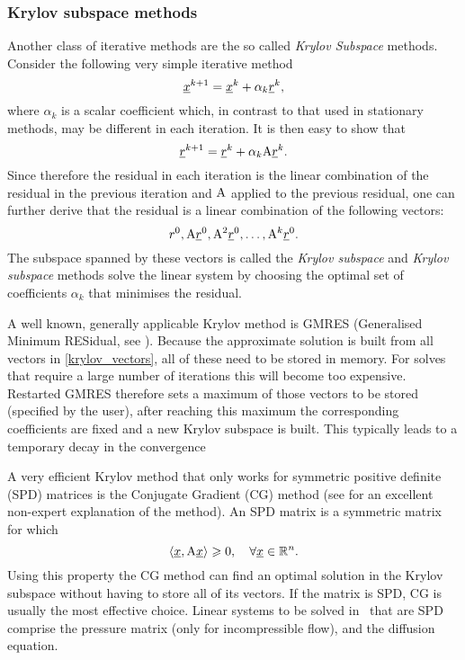 \subsubsection{Krylov subspace methods} \label{sec:krylov_subspace_methods}
Another class of iterative methods are the so called
\emph{Krylov Subspace} methods. Consider the following very
simple iterative method
\begin{equation*}
  \underline{x}^{k+1}=\underline{x}^k + \alpha_k \underline{r}^k,
\end{equation*}
where $\alpha_k$ is a scalar coefficient which,
in contrast to that used in stationary methods, may be different in each
iteration. It is then easy to show that
\begin{equation*}
  \underline{r}^{k+1}=\underline{r}^k+\alpha_k \mathrm{A}\underline{r}^k.
\end{equation*}
Since therefore the residual in each iteration is the linear
combination of the residual in the previous iteration and $\mathrm{A}$
applied to the previous residual, one can further derive that the
residual is a linear combination of the following vectors:
\begin{equation}\label{krylov_vectors}
  r^0, \mathrm{A}\underline{r}^{0}, \mathrm{A}^2\underline{r}^0, \ldots, \mathrm{A}^k\underline{r}^0.
\end{equation}
The subspace spanned by these vectors is called the \emph{Krylov subspace}
and \emph{Krylov subspace} methods solve the linear system by choosing
the optimal set of coefficients $\alpha_k$ that minimises the residual.

A well known, generally applicable Krylov method is GMRES
(Generalised Minimum RESidual, see \citet{saad1993}). Because the approximate solution
is built from all vectors in \eqref{krylov_vectors}, all of these need
to be stored in memory. For solves that require a large number of
iterations this will become too expensive. Restarted GMRES therefore sets
a maximum of those vectors to be stored (specified by the user),
after reaching this maximum the corresponding coefficients are fixed
and a new Krylov subspace is built. This typically leads to a
temporary decay in the convergence

A very efficient Krylov method that only works for symmetric
positive definite (SPD) matrices is the Conjugate
Gradient (CG) method (see \citet{shewchuk1994} for
an excellent non-expert explanation of the
method). An SPD matrix is a symmetric matrix for which
\begin{equation*}
  \langle \underline{x}, \mathrm{A}\underline{x}\rangle \geqslant 0, \quad \forall\underline{x}\in\mathbb{R}^n.
\end{equation*}
Using this property the CG method can find an optimal solution
in the Krylov subspace without having to store all of its
vectors. If the matrix is SPD, CG is usually the most
effective choice. Linear systems to be solved in \fluidity\ that are SPD
comprise the pressure matrix (only for incompressible flow), and the
diffusion equation.


